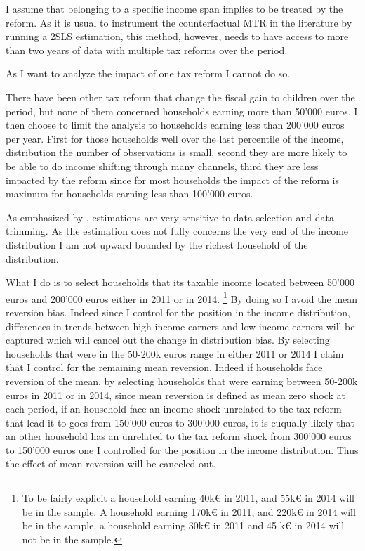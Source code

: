 I assume that belonging to a specific income span implies to be treated by the reform. As it is usual to instrument the counterfactual MTR in the literature by running a 2SLS estimation, this method, however, needs to have access to more than two years of data with multiple tax reforms over the period. 

As I want to analyze the impact of one tax reform I cannot do so.

There have been other tax reform that change the fiscal gain to children over the period, but none of them concerned households earning more than 50'000 euros. I then choose to limit the analysis to households earning less than 200'000 euros per year. First for those households well over the last percentile of the income, distribution the number of observations is small, second they are more likely to be able to do income shifting through many channels, third they are less impacted by the reform since for most households the impact of the reform is maximum for households earning less than 100'000 euros. 

As emphasized by \citet{kopczuk2005tax}, estimations are very sensitive to data-selection and data-trimming. As the estimation does not fully concerns the very end of the income distribution I am not upward bounded by the richest household of the distribution. 

What I do is to select households that its taxable income located between 50'000 euros and 200'000 euros either in 2011 or in 2014.
\footnote{To be fairly explicit a household earning 40k\euro{} in 2011, and 55k\euro{} in 2014 will be in the sample. A household earning 170k\euro{} in 2011, and 220k\euro{}  in 2014 will be in the sample, a household earning 30k\euro{} in 2011 and 45 k\euro{} in 2014 will not be in the sample.}
 By doing so I avoid the mean reversion bias. 
Indeed since I control for the position in the income distribution, differences in trends between high-income earners and low-income earners will be captured which will cancel out the change in distribution bias.
By selecting households that were in the 50-200k euros range in either 2011 or 2014 I claim that I control for the remaining mean reversion. Indeed if households face reversion of the mean, by selecting households that were earning between 50-200k euros in 2011 or in 2014, since mean reversion is defined as mean zero shock at each period, if an household face an income shock unrelated to the tax reform that lead it to goes from 150'000 euros to 300'000 euros, it is euqually likely that an other household has an unrelated to the tax reform shock from 300'000 euros to 150'000 euros one I controlled for the position in the income distribution. Thus the effect of mean reversion will be canceled out.

